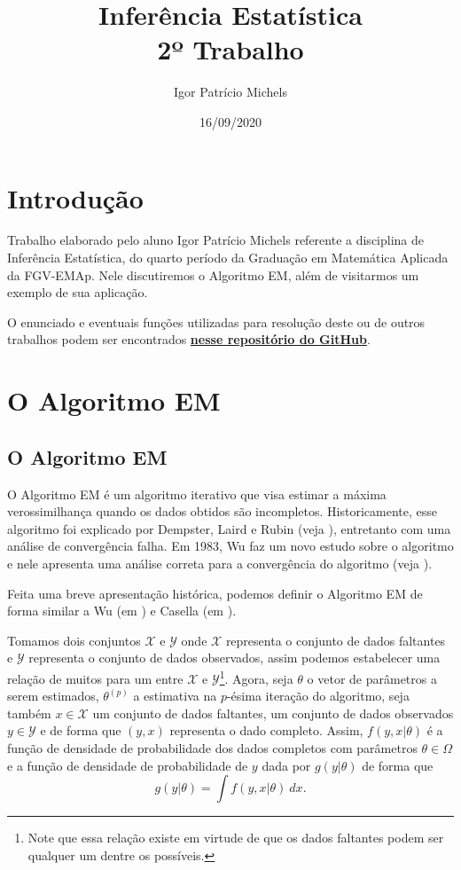 \documentclass{article}
\title{Inferência Estatística \\ 2º Trabalho}
\author{Igor Patrício Michels}
\date{16/09/2020}
\begin{document}
\maketitle

\section*{Introdução}

Trabalho elaborado pelo aluno Igor Patrício Michels referente a disciplina de Inferência Estatística, do quarto período da Graduação em Matemática Aplicada da FGV-EMAp. Nele discutiremos o Algoritmo EM, além de visitarmos um exemplo de sua aplicação.

O enunciado e eventuais funções utilizadas para resolução deste ou de outros trabalhos podem ser encontrados \href{https://github.com/IgorMichels/Statistical_Inference}{\textbf{nesse repositório do GitHub}}.

\section*{O Algoritmo EM}

\subsection*{O Algoritmo EM}

O Algoritmo EM é um algoritmo iterativo que visa estimar a máxima verossimilhança quando os dados obtidos são incompletos. Historicamente, esse algoritmo foi explicado por Dempster, Laird e Rubin (veja \cite{10.2307/2984875}), entretanto com uma análise de convergência falha. Em 1983, Wu faz um novo estudo sobre o algoritmo e nele apresenta uma análise correta para a convergência do algoritmo (veja \cite{wu1983}).

Feita uma breve apresentação histórica, podemos definir o Algoritmo EM de forma similar a Wu (em \cite{wu1983}) e Casella (em \cite{casella}).

Tomamos dois conjuntos $\mathscr{X}$ e $\mathscr{Y}$ onde $\mathscr{X}$ representa o conjunto de dados faltantes e $\mathscr{Y}$ representa o conjunto de dados observados, assim podemos estabelecer uma relação de muitos para um entre $\mathscr{X}$ e $\mathscr{Y}$\footnote{Note que essa relação existe em virtude de que os dados faltantes podem ser qualquer um dentre os possíveis.}. Agora, seja $\theta$ o vetor de parâmetros a serem estimados, $\theta^{(p)}$ a estimativa na $p$-ésima iteração do algoritmo, seja também $x \in \mathscr{X}$ um conjunto de dados faltantes, um conjunto de dados observados $y \in \mathscr{Y}$ e de forma que $(y, x)$ representa o dado completo. Assim, $f(y, x | \theta)$ é a função de densidade de probabilidade dos dados completos com parâmetros $\theta \in \Omega$ e a função de densidade de probabilidade de $y$ dada por $g(y | \theta)$ de forma que
\[g(y | \theta) = \int f(y, x | \theta) ~dx.\]
\end{document}
